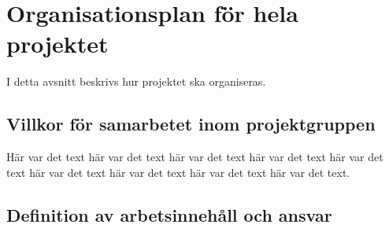 \documentclass[a4paper,titlepage,12pt]{article}
\begin{document}
	
	\section{Organisationsplan för hela projektet}
    I detta avsnitt beskrivs hur projektet ska organiseras.

	
	 
	\subsection{Villkor för samarbetet inom projektgruppen}
	Här var det text här var det text här var det text
	här var det text här var det text här var det text
	här var det text här var det text här var det text.
	
	\subsection{Definition av arbetsinnehåll och ansvar}
%
	
\end{document}
